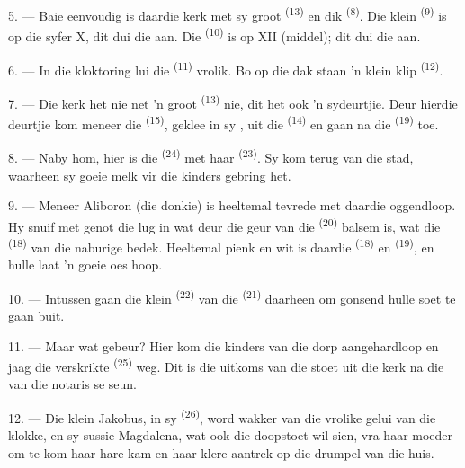 \VUsaut{3.4mm}
\VUsaut{3.0mm}

5. --- Baie eenvoudig is daardie kerk met sy groot 
\textsuperscript{(13)} en dik  \textsuperscript{(8)}. Die klein
 \textsuperscript{(9)} is op die syfer X, dit dui die  aan.
Die  \textsuperscript{(10)} is op XII (middel); dit dui die
 aan.

6. --- In die kloktoring lui die  \textsuperscript{(11)} vrolik. Bo op
die dak staan 'n klein klip  \textsuperscript{(12)}.

7. --- Die kerk het nie net 'n groot  \textsuperscript{(13)} nie, dit
het ook 'n sydeurtjie. Deur hierdie deurtjie kom meneer die 
\textsuperscript{(15)}, geklee in sy , uit die 
\textsuperscript{(14)} en gaan na die  \textsuperscript{(19)} toe.

8. --- Naby hom, hier is die  \textsuperscript{(24)} met haar
 \textsuperscript{(23)}. Sy kom terug van die stad, waarheen sy goeie melk
vir die kinders gebring het.

\VUsaut{4.0mm}
\VUsaut{3.4mm}

9. --- Meneer Aliboron (die donkie) is heeltemal tevrede met daardie oggendloop. Hy
snuif met genot die lug in wat deur die geur van die 
\textsuperscript{(20)} balsem is, wat die  \textsuperscript{(18)} van
die naburige  bedek. Heeltemal pienk en wit is daardie
 \textsuperscript{(18)} en 
\textsuperscript{(19)}, en hulle laat 'n goeie oes hoop.

10. --- Intussen gaan die klein  \textsuperscript{(22)} van die
 \textsuperscript{(21)} daarheen om gonsend hulle soet 
te gaan buit.

11. --- Maar wat gebeur? Hier kom die kinders van die dorp aangehardloop en jaag die
verskrikte  \textsuperscript{(25)} weg. Dit is die uitkoms van die stoet
uit die kerk na die  van die notaris se seun.

12. --- Die klein Jakobus, in sy  \textsuperscript{(26)}, word wakker van
die vrolike gelui van die klokke, en sy sussie Magdalena, wat ook die doopstoet wil
sien, vra haar moeder om te kom haar hare kam en haar klere aantrek op die drumpel van
die huis.

